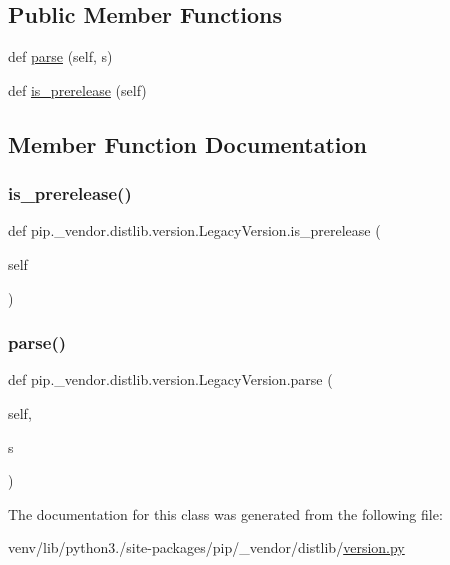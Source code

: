 \subsection*{Public Member Functions}
\begin{DoxyCompactItemize}
\item 
def \hyperlink{classpip_1_1__vendor_1_1distlib_1_1version_1_1LegacyVersion_afc97c36278a87b7d86aa2445090848eb}{parse} (self, s)
\item 
def \hyperlink{classpip_1_1__vendor_1_1distlib_1_1version_1_1LegacyVersion_ae565a43ab0aa34a7097a337ee47fd5e6}{is\+\_\+prerelease} (self)
\end{DoxyCompactItemize}


\subsection{Member Function Documentation}
\mbox{\label{classpip_1_1__vendor_1_1distlib_1_1version_1_1LegacyVersion_ae565a43ab0aa34a7097a337ee47fd5e6}} 
\subsubsection{\texorpdfstring{is\+\_\+prerelease()}{is\_prerelease()}}
{\footnotesize\ttfamily def pip.\+\_\+vendor.\+distlib.\+version.\+Legacy\+Version.\+is\+\_\+prerelease (\begin{DoxyParamCaption}\item[{}]{self }\end{DoxyParamCaption})}

\mbox{\label{classpip_1_1__vendor_1_1distlib_1_1version_1_1LegacyVersion_afc97c36278a87b7d86aa2445090848eb}} 
\subsubsection{\texorpdfstring{parse()}{parse()}}
{\footnotesize\ttfamily def pip.\+\_\+vendor.\+distlib.\+version.\+Legacy\+Version.\+parse (\begin{DoxyParamCaption}\item[{}]{self,  }\item[{}]{s }\end{DoxyParamCaption})}



The documentation for this class was generated from the following file\+:\begin{DoxyCompactItemize}
\item 
venv/lib/python3./site-\/packages/pip/\+\_\+vendor/distlib/\hyperlink{pip_2__vendor_2distlib_2version_8py}{version.\+py}\end{DoxyCompactItemize}
